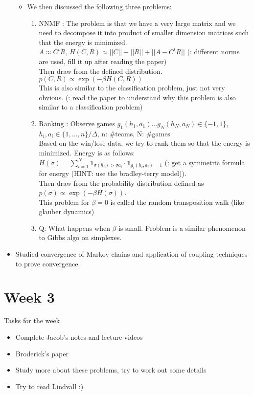 \documentclass{article}
\begin{document}
\begin{itemize}
\begin{itemize}
					\item We then discussed the following three problems:
						\begin{enumerate}
							\item NNMF : The problem is that we have a very large matrix and we need to decompose it into product of smaller dimension matrices such that the energy is minimized. \\
							$A \approx C^tR$, $H(C, R) \approx ||C|| + ||R|| + ||A-C^tR||$ (\todo: different norms are used, fill it up after reading the paper)\\
							Then draw from the defined distribution. $p(C, R) \propto \exp(-\beta H(C, R))$\\
							This is also similar to the classification problem, just not very obvious. (\todo: read the paper to understand why this problem is also similar to a classification problem)
							\item Ranking : Observe games $g_1(h_1, a_1) \dots g_N(h_N, a_N) \in \{-1, 1\}$, $h_i, a_i \in \{1, \dots, n\}/\Delta$, n: \#teams, N: \#games\\
							Based on the win/lose data, we try to rank them so that the energy is minimized. Energy is as follows: $H(\sigma) = \sum_{i = 1}^N \mathbb{1}_{\sigma(h_i)>\sigma{a_i}}\cdot\mathbb{1}_{g_i(h_i, a_i) = 1}$ (\todo: get a symmetric formula for energy (HINT: use the bradley-terry model)).\\
							Then draw from the probability distribution defined as $p(\sigma) \propto \exp(-\beta H(\sigma))$.\\
							This problem for $\beta = 0$ is called the random transposition walk (like glauber dynamics)
							\item Q: What happens when $\beta$ is small. Problem is a similar phenomenon to Gibbs algo on simplexes.
						\end{enumerate}
				\end{itemize}
			\item Studied convergence of Markov chains and application of coupling techniques to prove convergence.
		\end{itemize}

	\section{Week 3}
		Tasks for the week
		\begin{itemize}
			\item Complete Jacob's notes and lecture videos
			\item Broderick's paper
   			\item Study more about these problems, try to work out some details
      		\item Try to read Lindvall :)
		\end{itemize}
\end{document}
